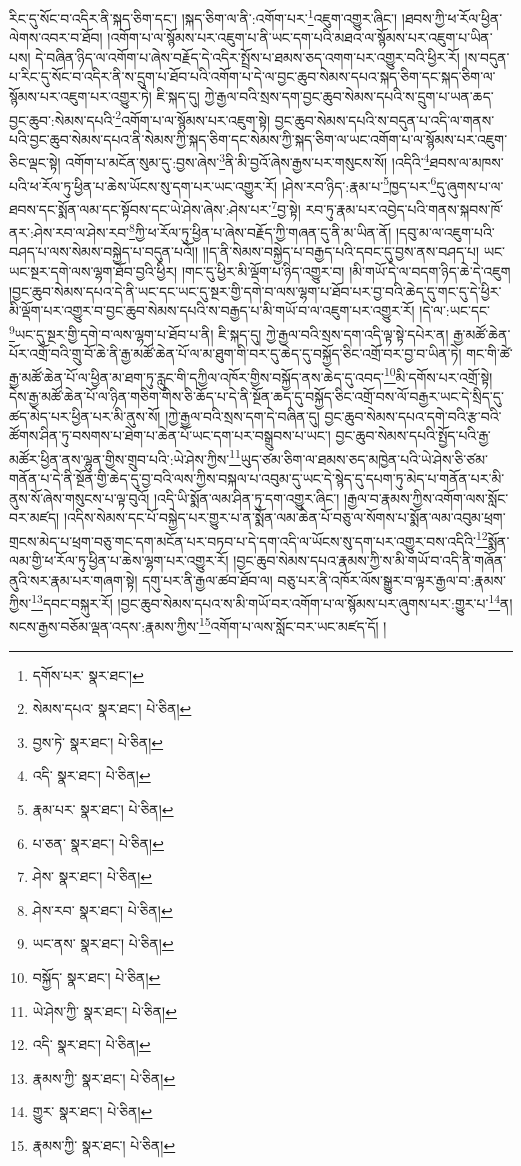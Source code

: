 རིང་དུ་སོང་བ་འདིར་ནི་སྐད་ཅིག་དང་། །སྐད་ཅིག་ལ་ནི་:འགོག་པར་\footnote{དགོས་པར་  སྣར་ཐང་། }འཇུག་འགྱུར་ཞིང་། །ཐབས་ཀྱི་ཕ་རོལ་ཕྱིན་ལེགས་འབར་བ་ཐོབ། །འགོག་པ་ལ་སྙོམས་པར་འཇུག་པ་ནི་ཡང་དག་པའི་མཐའ་ལ་སྙོམས་པར་འཇུག་པ་ཡིན་པས། དེ་བཞིན་ཉིད་ལ་འགོག་པ་ཞེས་བརྗོད་དེ་འདིར་སྤྲོས་པ་ཐམས་ཅད་འགག་པར་འགྱུར་བའི་ཕྱིར་རོ། །ས་བདུན་པ་རིང་དུ་སོང་བ་འདིར་ནི་ས་དྲུག་པ་ཐོབ་པའི་འགོག་པ་དེ་ལ་བྱང་ཆུབ་སེམས་དཔའ་སྐད་ཅིག་དང་སྐད་ཅིག་ལ་སྙོམས་པར་འཇུག་པར་འགྱུར་ཏེ། ཇི་སྐད་དུ། ཀྱེ་རྒྱལ་བའི་སྲས་དག་བྱང་ཆུབ་སེམས་དཔའི་ས་དྲུག་པ་ཡན་ཆད་བྱང་ཆུབ་:སེམས་དཔའི་\footnote{སེམས་དཔའ་  སྣར་ཐང་།  པེ་ཅིན། }འགོག་པ་ལ་སྙོམས་པར་འཇུག་སྟེ། བྱང་ཆུབ་སེམས་དཔའི་ས་བདུན་པ་འདི་ལ་གནས་པའི་བྱང་ཆུབ་སེམས་དཔའ་ནི་སེམས་ཀྱི་སྐད་ཅིག་དང་སེམས་ཀྱི་སྐད་ཅིག་ལ་ཡང་འགོག་པ་ལ་སྙོམས་པར་འཇུག་ཅིང་ལྡང་སྟེ། འགོག་པ་མངོན་སུམ་དུ་:བྱས་ཞེས་\footnote{བྱས་ཏེ་  སྣར་ཐང་།  པེ་ཅིན། }ནི་མི་བྱའོ་ཞེས་རྒྱས་པར་གསུངས་སོ། །འདིའི་\footnote{འདི་  སྣར་ཐང་།  པེ་ཅིན། }ཐབས་ལ་མཁས་པའི་ཕ་རོལ་ཏུ་ཕྱིན་པ་ཆེས་ཡོངས་སུ་དག་པར་ཡང་འགྱུར་རོ། །ཤེས་རབ་ཉིད་:རྣམ་པ་\footnote{རྣམ་པར་  སྣར་ཐང་།  པེ་ཅིན། }ཁྱད་པར་\footnote{པ་ཅན་  སྣར་ཐང་།  པེ་ཅིན། }དུ་ཞུགས་པ་ལ་ཐབས་དང་སྨོན་ལམ་དང་སྟོབས་དང་ཡེ་ཤེས་ཞེས་:ཤེས་པར་\footnote{ཤེས་  སྣར་ཐང་།  པེ་ཅིན། }བྱ་སྟེ། རབ་ཏུ་རྣམ་པར་འབྱེད་པའི་གནས་སྐབས་ཁོ་ནར་:ཤེས་རབ་ལ་ཤེས་རབ་\footnote{ཤེས་རབ་  སྣར་ཐང་།  པེ་ཅིན། }ཀྱི་ཕ་རོལ་ཏུ་ཕྱིན་པ་ཞེས་བརྗོད་ཀྱི་གཞན་དུ་ནི་མ་ཡིན་ནོ། །དབུ་མ་ལ་འཇུག་པའི་བཤད་པ་ལས་སེམས་བསྐྱེད་པ་བདུན་པའོ།། །།ད་ནི་སེམས་བསྐྱེད་པ་བརྒྱད་པའི་དབང་དུ་བྱས་ནས་བཤད་པ། ཡང་ཡང་སྔར་དགེ་ལས་ལྷག་ཐོབ་བྱའི་ཕྱིར། །གང་དུ་ཕྱིར་མི་ལྡོག་པ་ཉིད་འགྱུར་བ། །མི་གཡོ་དེ་ལ་བདག་ཉིད་ཆེ་དེ་འཇུག །བྱང་ཆུབ་སེམས་དཔའ་དེ་ནི་ཡང་དང་ཡང་དུ་སྔར་གྱི་དགེ་བ་ལས་ལྷག་པ་ཐོབ་པར་བྱ་བའི་ཆེད་དུ་གང་དུ་དེ་ཕྱིར་མི་ལྡོག་པར་འགྱུར་བ་བྱང་ཆུབ་སེམས་དཔའི་ས་བརྒྱད་པ་མི་གཡོ་བ་ལ་འཇུག་པར་འགྱུར་རོ། །དེ་ལ་:ཡང་དང་\footnote{ཡང་ནས་  སྣར་ཐང་།  པེ་ཅིན། }ཡང་དུ་སྔར་གྱི་དགེ་བ་ལས་ལྷག་པ་ཐོབ་པ་ནི། ཇི་སྐད་དུ། ཀྱེ་རྒྱལ་བའི་སྲས་དག་འདི་ལྟ་སྟེ་དཔེར་ན། རྒྱ་མཚོ་ཆེན་པོར་འགྲོ་བའི་གྲུ་བོ་ཆེ་ནི་རྒྱ་མཚོ་ཆེན་པོ་ལ་མ་ཐུག་གི་བར་དུ་ཆེད་དུ་བསྐྱོད་ཅིང་འགྲོ་བར་བྱ་བ་ཡིན་ཏེ། གང་གི་ཚེ་རྒྱ་མཚོ་ཆེན་པོ་ལ་ཕྱིན་མ་ཐག་ཏུ་རླུང་གི་དཀྱིལ་འཁོར་གྱིས་བསྐྱོད་ནས་ཆེད་དུ་འབད་\footnote{བསྐྱོད་  སྣར་ཐང་།  པེ་ཅིན། }མི་དགོས་པར་འགྲོ་སྟེ། དེས་རྒྱ་མཚོ་ཆེན་པོ་ལ་ཉིན་གཅིག་གིས་ཅི་ཆོད་པ་དེ་ནི་སྔོན་ཆད་དུ་བསྐྱོད་ཅིང་འགྲོ་བས་ལོ་བརྒྱར་ཡང་དེ་སྲིད་དུ་ཚད་མེད་པར་ཕྱིན་པར་མི་ནུས་སོ། །ཀྱེ་རྒྱལ་བའི་སྲས་དག་དེ་བཞིན་དུ། བྱང་ཆུབ་སེམས་དཔའ་དགེ་བའི་རྩ་བའི་ཚོགས་ཤིན་ཏུ་བསགས་པ་ཐེག་པ་ཆེན་པོ་ཡང་དག་པར་བསྒྲུབས་པ་ཡང་། བྱང་ཆུབ་སེམས་དཔའི་སྤྱོད་པའི་རྒྱ་མཚོར་ཕྱིན་ནས་ལྷུན་གྱིས་གྲུབ་པའི་:ཡེ་ཤེས་ཀྱིས་\footnote{ཡེ་ཤེས་ཀྱི་  སྣར་ཐང་།  པེ་ཅིན། }ཡུད་ཙམ་ཅིག་ལ་ཐམས་ཅད་མཁྱེན་པའི་ཡེ་ཤེས་ཅི་ཙམ་གནོན་པ་དེ་ནི་སྔོན་གྱི་ཆེད་དུ་བྱ་བའི་ལས་ཀྱིས་བསྐལ་པ་འབུམ་དུ་ཡང་དེ་སྙེད་དུ་དཔག་ཏུ་མེད་པ་གནོན་པར་མི་ནུས་སོ་ཞེས་གསུངས་པ་ལྟ་བུའོ། །འདི་ཡི་སྨོན་ལམ་ཤིན་ཏུ་དག་འགྱུར་ཞིང་། །རྒྱལ་བ་རྣམས་ཀྱིས་འགོག་ལས་སློང་བར་མཛད། །འདིས་སེམས་དང་པོ་བསྐྱེད་པར་གྱུར་པ་ན་སྨོན་ལམ་ཆེན་པོ་བཅུ་ལ་སོགས་པ་སྨོན་ལམ་འབུམ་ཕྲག་གྲངས་མེད་པ་ཕྲག་བཅུ་གང་དག་མངོན་པར་བཏབ་པ་དེ་དག་འདི་ལ་ཡོངས་སུ་དག་པར་འགྱུར་བས་འདིའི་\footnote{འདི་  སྣར་ཐང་།  པེ་ཅིན། }སྨོན་ལམ་གྱི་ཕ་རོལ་ཏུ་ཕྱིན་པ་ཆེས་ལྷག་པར་འགྱུར་རོ། །བྱང་ཆུབ་སེམས་དཔའ་རྣམས་ཀྱི་ས་མི་གཡོ་བ་འདི་ནི་གཞོན་ནུའི་སར་རྣམ་པར་གཞག་སྟེ། དགུ་པར་ནི་རྒྱལ་ཚབ་ཐོབ་ལ། བཅུ་པར་ནི་འཁོར་ལོས་སྒྱུར་བ་ལྟར་རྒྱལ་བ་:རྣམས་ཀྱིས་\footnote{རྣམས་ཀྱི་  སྣར་ཐང་།  པེ་ཅིན། }དབང་བསྐུར་རོ། །བྱང་ཆུབ་སེམས་དཔའ་ས་མི་གཡོ་བར་འགོག་པ་ལ་སྙོམས་པར་ཞུགས་པར་:གྱུར་པ་\footnote{གྱུར་  སྣར་ཐང་།  པེ་ཅིན། }ན། སངས་རྒྱས་བཅོམ་ལྡན་འདས་:རྣམས་ཀྱིས་\footnote{རྣམས་ཀྱི་  སྣར་ཐང་།  པེ་ཅིན། }འགོག་པ་ལས་སློང་བར་ཡང་མཛད་དོ། །
